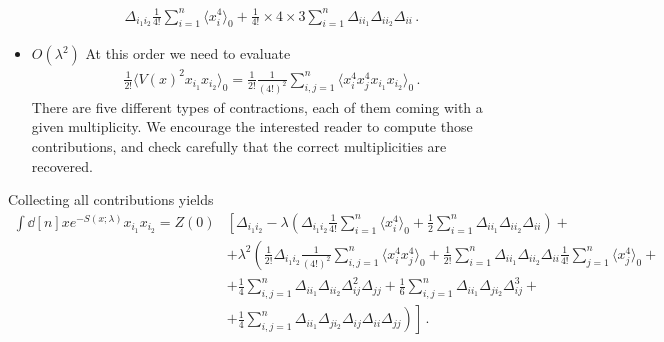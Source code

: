 \documentclass[notes.tex]{subfiles}
\begin{document}
\begin{itemize}
\begin{align}
    \Delta_{i_1 i_2} \frac{1}{4!} \sum_{i=1}^n \langle x_i^4\rangle_0
    + \frac{1}{4!} \times 4 \times 3 \sum_{i=1}^n \Delta_{i i_1}
    \Delta_{i i_2} \Delta_{i i} \, .
  \end{align}
\item $O(\lambda^2)$ At this order we need to evaluate
  \begin{align}
    \frac{1}{2!} \langle V(x)^2 x_{i_1} x_{i_2} \rangle_0 = 
    \frac{1}{2!} \frac{1}{(4!)^2} \sum_{i,j=1}^n \langle x_i^4 x_j^4
    x_{i_1} x_{i_2} \rangle_0\, .
  \end{align}
  There are five different types of contractions, each of them coming
  with a given multiplicity. We encourage the interested reader to
  compute those contributions, and check carefully that the correct
  multiplicities are recovered. 
\end{itemize}
Collecting all contributions yields
\begin{align}
  \int \dd[n]{x} e^{-S(x;\lambda)} 
  x_{i_1} x_{i_2} = Z(0) & 
                           \left[
                           \Delta_{i_1 i_2} - \lambda \left(\Delta_{i_1 i_2}
                           \frac{1}{4!} \sum_{i=1}^n \langle
                           x_i^4\rangle_0 +  \frac12 \sum_{i=1}^n
                           \Delta_{i i_1} \Delta_{i i_2} \Delta_{i i} 
                           \right) + \right. \nonumber \\
                         & \left.
                           + \lambda^2 \left( 
                           \frac{1}{2!} \Delta_{i_1 i_2} \frac{1}{(4!)^2}
                           \sum_{i,j=1}^n \langle x_i^4 x_j^4 \rangle_0
                           + \frac{1}{2!} \sum_{i=1}^n \Delta_{i i_1}
                           \Delta_{i i_2} \Delta_{i i}  \frac{1}{4!}
                           \sum_{j=1}^n \langle x_j^4 \rangle_0
                           + \right. \right. \nonumber \\
                         & + \left. \left.
                           \frac{1}{4} \sum_{i,j=1}^n \Delta_{i i_1}
                           \Delta_{i i_2} \Delta_{i j}^2 \Delta_{jj}
                           + \frac{1}{6} \sum_{i,j=1}^n \Delta_{i i_1}
                           \Delta_{j i_2} \Delta_{i j}^3 +
                           \right. \right. \nonumber \\
  \label{eq:TwoPointNotNorm}
                         & + \left. \left.
                           \frac{1}{4} \sum_{i,j=1}^n \Delta_{i i_1}
                           \Delta_{j i_2} \Delta_{i j} \Delta_{ii}\Delta_{jj}
                           \right)
                           \right]\, .
\end{align}
\end{document}

